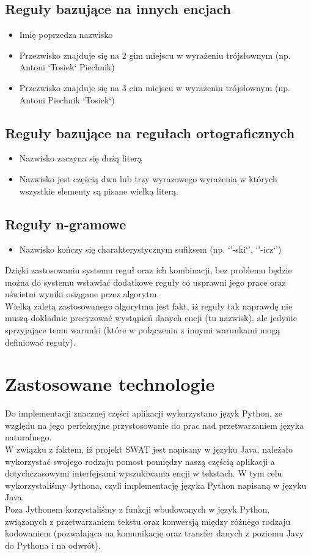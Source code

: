 \documentclass[12pt]{article}
\begin{document}
\subsection {Reguły bazujące na innych encjach}
\begin{itemize}
\item Imię poprzedza nazwisko
\item Przezwisko znajduje się na 2 gim miejscu w wyrażeniu trójsłownym (np. Antoni `Tosiek` Piechnik)
\item Przezwisko znajduje się na 3 cim miejscu w wyrażeniu trójsłownym (np. Antoni Piechnik `Tosiek`)
\end{itemize}

\subsection {Reguły bazujące na regułach ortograficznych }
\begin{itemize}
\item Nazwisko zaczyna się dużą literą
\item Nazwisko jest częścią dwu lub trzy wyrazowego wyrażenia w których wszystkie elementy są pisane wielką literą.
\end{itemize}

\subsection {Reguły n-gramowe}
\begin{itemize}
\item Nazwisko kończy się charakterystycznym sufiksem (np. `'-ski`', `'-icz`')
\end{itemize}
Dzięki zastosowaniu systemu reguł oraz ich kombinacji, bez problemu będzie można do systemu wstawiać dodatkowe reguły co usprawni jego prace oraz uświetni wyniki osiągane przez algorytm.
\\Wielką zaletą zastosowanego algorytmu jest fakt, iż reguły tak naprawdę nie muszą dokładnie precyzować wystąpień danych encji (tu nazwisk), ale jedynie sprzyjające temu warunki (które w połączeniu z innymi warunkami mogą definiować reguły).

\section{Zastosowane technologie}
Do implementacji znacznej części aplikacji wykorzystano język Python, ze względu na jego perfekcyjne przystosowanie do prac nad przetwarzaniem języka naturalnego.
\\W związku z faktem, iż projekt SWAT jest napisany w języku Java, należało wykorzystać swojego rodzaju pomost pomiędzy naszą częścią aplikacji a dotychczasowymi interfejsami wyszukiwania encji w tekstach. W tym celu wykorzystaliśmy Jythona, czyli implementację języka Python napisaną w języku Java.
\\Poza Jythonem korzystaliśmy z funkcji wbudowanych w język Python, związanych z przetwarzaniem tekstu oraz konwersją między różnego rodzaju kodowaniem (pozwalająca na komunikację oraz transfer danych z poziomu Javy do Pythona i na odwrót).
\end{document}
